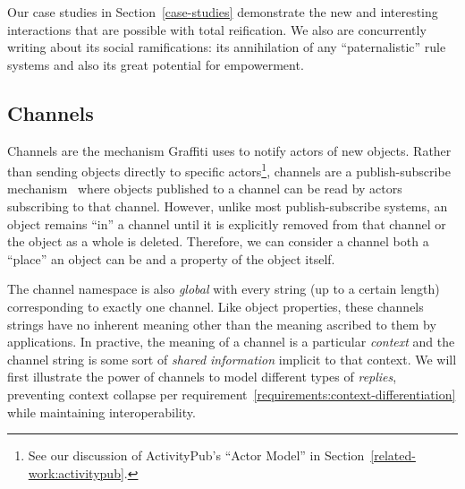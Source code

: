 Our case studies in Section~\ref{case-studies} demonstrate
the new and interesting interactions that are possible with
total reification.
We also are concurrently writing about its social
ramifications: its annihilation of any ``paternalistic''
rule systems and also its great potential for empowerment.




\subsection{Channels}
\label{concepts:channels}

Channels are the mechanism Graffiti uses to notify
actors of new objects.
Rather than sending objects directly to specific actors\footnote{
    See our discussion of ActivityPub's ``Actor Model'' in Section~\ref{related-work:activitypub}.
},
channels are a publish-subscribe mechanism~\cite{pubsub}
where objects published to a channel
can be read by actors subscribing to that channel.
However, unlike most publish-subscribe systems,
an object remains ``in'' a channel until
it is explicitly removed from that channel
or the object as a whole is deleted.
Therefore, we can consider a channel both a ``place''
an object can be and a property of the object itself.

The channel namespace is also \emph{global} with every string (up to a certain length)
corresponding to exactly one channel.
Like object properties, these channels strings have no inherent meaning
other than the meaning ascribed to them by applications.
In practive, the meaning of a channel is a particular \emph{context} and the channel
string is some sort of \emph{shared information} implicit to that context.
We will first illustrate the power of channels
to model different types of \emph{replies},
preventing context collapse per requirement~\ref{requirements:context-differentiation}
while maintaining interoperability.

